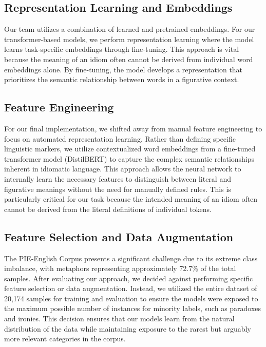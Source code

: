 \documentclass[11pt]{article}
\begin{document}
\subsection{Representation Learning and Embeddings}
Our team utilizes a combination of learned and
 pretrained embeddings. For our transformer-based models, 
 we perform representation learning where the model learns 
 task-specific embeddings through fine-tuning. This approach
  is vital because the meaning of an idiom often cannot 
  be derived from individual word embeddings alone. 
  By fine-tuning, the model develops a representation 
  that prioritizes the semantic relationship between words
   in a figurative context.


\subsection{Feature Engineering}

For our final implementation, we shifted away from manual 
feature engineering to focus on automated representation 
learning. Rather than defining specific linguistic 
markers, we utilize contextualized word embeddings from a
 fine-tuned transformer model (DistilBERT) to 
 capture the complex semantic relationships
  inherent in idiomatic language. This approach allows
   the neural network to internally learn the necessary
    features to distinguish between literal and figurative
     meanings without the need for manually defined rules. This
      is particularly critical for our task because
       the intended meaning of an idiom often cannot 
       be derived from the literal definitions of
        individual tokens.

\subsection{Feature Selection and Data Augmentation}
The PIE-English Corpus presents a significant challenge
 due to its extreme class imbalance, with metaphors 
 representing approximately 72.7\% of the total samples. After
  evaluating our approach, we decided against performing 
  specific feature selection or data augmentation. 
  Instead, we utilized the entire dataset of 20,174 samples
   for training and evaluation to ensure the models were
    exposed to the maximum possible number of instances for 
  minority labels, such as paradoxes and ironies. 
  This decision ensures that our models learn from 
  the natural distribution of the data while
   maintaining exposure to the rarest but arguably more relevant
   categories in the corpus.
\end{document}
